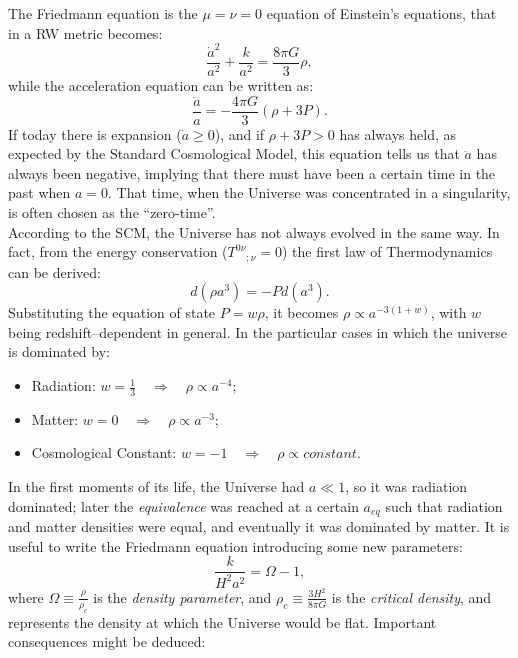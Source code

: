 The Friedmann equation is the $\mu = \nu = 0$ equation of Einstein's equations, that in a RW metric becomes:
\begin{equation}
\frac{\dot{a}^{2}}{a^{2}} + \frac{k}{a^{2}} = \frac{8 \pi G}{3} \rho,\label{friedmann}
\end{equation}
while the acceleration equation can be written as:
\begin{equation}
\frac{\ddot{a}}{a}= -\frac{4 \pi G}{3}(\rho + 3P).\label{accelerazione}
\end{equation}
If today there is expansion ($\dot{a}\ge 0$), and if $\rho + 3P > 0$ has always held, as expected by the Standard Cosmological Model, this equation tells us that $\ddot{a}$ has always been negative, implying that there must have been a certain time in the past when $a=0$. That time, when the Universe was concentrated in a singularity, is often chosen as the ``zero-time''.\\
According to the SCM, the Universe has not always evolved in the same way. In fact, from the energy conservation ($T^{0 \nu}\phantom{}_{; \nu}=0$) the first law of Thermodynamics can be derived:
\begin{equation}
d(\rho a^3) = -Pd(a^3).\label{termodinamica}
\end{equation}
Substituting the equation of state $P=w\rho$, it becomes $\rho \propto a^{-3(1+w)}$, with $w$ being redshift--dependent in general. In the particular cases in which the universe is dominated by:
\begin{itemize}
\item Radiation: $w=\frac{1}{3} \quad \Rightarrow \quad \rho \propto a^{-4}$; 
\item Matter: $w=0 \quad \Rightarrow \quad \rho \propto a^{-3}$;
\item Cosmological Constant: $w=-1 \quad \Rightarrow \quad \rho \propto constant$. 
\end{itemize}
In the first moments of its life, the Universe had $a \ll 1$, so it was radiation dominated; later the \emph{equivalence} was reached at a certain $a_{eq}$ such that radiation and matter densities were equal, and eventually it was dominated by matter. %
It is useful to write the Friedmann equation introducing some new parameters:
\begin{equation}
\frac{k}{H^2 a^2} = \Omega -  1,\label{friedmann2}
\end{equation}where $\Omega \equiv \frac{\rho}{\rho_c}$ is the \emph{density parameter}, and $\rho_c \equiv \frac{3H^2}{8\pi G}$ is the \emph{critical density}, and represents the density at which the Universe would be flat. Important consequences might be deduced:

